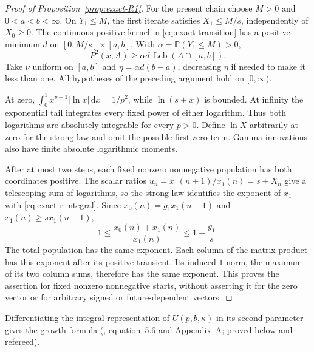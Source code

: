 \begin{proof}[Proof of Proposition~\ref{prop:exact-R1}]
For the present chain choose $M>0$ and $0<a<b<\infty$. On $Y_1\leq M$, the first iterate satisfies $X_1\leq M/s$, independently of $X_0\geq0$. The continuous positive kernel in \eqref{eq:exact-transition} has a positive minimum $d$ on $[0,M/s]\times[a,b]$. With $\alpha=\mathbb P(Y_1\leq M)>0$,
\begin{equation}
 P^2(x,A)\geq\alpha d\,\operatorname{Leb}(A\cap[a,b]).
 \label{eq:exact-minorization}
\end{equation}
Take $\nu$ uniform on $[a,b]$ and $\eta=\alpha d(b-a)$, decreasing $\eta$ if needed to make it less than one. All hypotheses of the preceding argument hold on $[0,\infty)$.

At zero, $\int_0^1x^{p-1}|\ln x|\,\mathrm{d}x=1/p^2$, while $\ln(s+x)$ is bounded. At infinity the exponential tail integrates every fixed power of either logarithm. Thus both logarithms are absolutely integrable for every $p>0$. Define $\ln X$ arbitrarily at zero for the strong law and omit the possible first zero term. Gamma innovations also have finite absolute logarithmic moments.

After at most two steps, each fixed nonzero nonnegative population has both coordinates positive. The scalar ratios $u_n=x_1(n+1)/x_1(n)=s+X_n$ give a telescoping sum of logarithms, so the strong law identifies the exponent of $x_1$ with \eqref{eq:exact-r-integral}. Since $x_0(n)=g_1x_1(n-1)$ and $x_1(n)\geq s x_1(n-1)$,
\begin{equation}
 1\leq\frac{x_0(n)+x_1(n)}{x_1(n)}\leq1+\frac{g_1}{s}.
 \label{eq:exact-vector-bound}
\end{equation}
The total population has the same exponent. Each column of the matrix product has this exponent after its positive transient. Its induced $1$-norm, the maximum of its two column sums, therefore has the same exponent. This proves the assertion for fixed nonzero nonnegative starts, without asserting it for the zero vector or for arbitrary signed or future-dependent vectors.
\end{proof}

Differentiating the integral representation of $U(p,b,\kappa)$ in its second parameter gives the growth formula (\citealp{roerdink1988}, equation~5.6 and Appendix~A; proved below and refereed).

